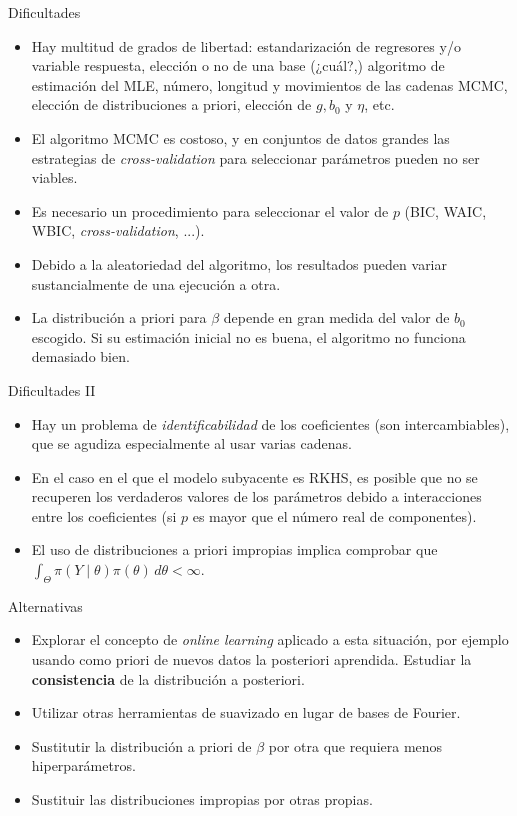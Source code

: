 \documentclass[10pt, spanish, professionalfonts]{beamer}
\begin{document}
\begin{frame}{Dificultades}
  \begin{itemize}


  \item Hay multitud de grados de libertad: estandarización de regresores y/o variable respuesta, elección o no de una base (¿cuál?,) algoritmo de estimación del MLE, número, longitud y movimientos de las cadenas MCMC, elección de distribuciones a priori, elección de \(g, b_0\) y \(\eta\), etc.
  \item El algoritmo MCMC es costoso, y en conjuntos de datos grandes las estrategias de \textit{cross-validation} para seleccionar parámetros pueden no ser viables.
  \item Es necesario un procedimiento para seleccionar el valor de \(p\) (BIC, WAIC, WBIC, \textit{cross-validation}, ...).
  \item Debido a la aleatoriedad del algoritmo, los resultados pueden variar sustancialmente de una ejecución a otra.
  \item La distribución a priori para \(\beta\) depende en gran medida del valor de \(b_0\) escogido. Si su estimación inicial no es buena, el algoritmo no funciona demasiado bien.
\end{itemize}
\end{frame}

\begin{frame}{Dificultades II}
  \begin{itemize}
    \item Hay un problema de \textit{identificabilidad} de los coeficientes (son intercambiables), que se agudiza especialmente al usar varias cadenas.
    \item En el caso en el que el modelo subyacente es RKHS, es posible que no se recuperen los verdaderos valores de los parámetros debido a interacciones entre los coeficientes (si \(p\) es mayor que el número real de componentes).
    \item El uso de distribuciones a priori impropias implica comprobar que \(\int_{\Theta} \pi(Y\mid \theta)\pi(\theta)\, d\theta < \infty\).
  \end{itemize}
\end{frame}

\begin{frame}{Alternativas}
  \begin{itemize}
    \item Explorar el concepto de \textit{online learning} aplicado a esta situación, por ejemplo usando como priori de nuevos datos la posteriori aprendida. Estudiar la \textbf{consistencia} de la distribución a posteriori.
    \item Utilizar otras herramientas de suavizado en lugar de bases de Fourier.
    \item Sustitutir la distribución a priori de \(\beta\) por otra que requiera menos hiperparámetros.
    \item Sustituir las distribuciones impropias por otras propias.
  \end{itemize}

\end{frame}
\end{document}
